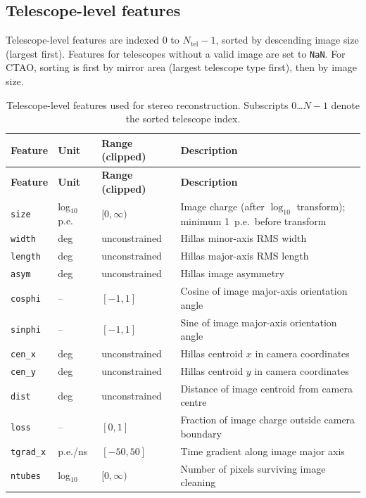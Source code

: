 \documentclass[12pt]{article}
\begin{document}
\subsection{Telescope-level features}

Telescope-level features are indexed 0 to $N_\mathrm{tel}-1$, sorted by descending
image size (largest first). Features for telescopes without a valid image are set to \texttt{NaN}.
For CTAO, sorting is first by mirror area (largest telescope type first), then by image size.

\begin{longtable}{lll p{5.5cm}}
\caption{Telescope-level features used for stereo reconstruction.
Subscripts 0\ldots$N-1$ denote the sorted telescope index.} \label{tab:features-image} \\
\hline
\textbf{Feature} & \textbf{Unit} & \textbf{Range (clipped)} & \textbf{Description} \\
\hline
\endfirsthead
\hline
\textbf{Feature} & \textbf{Unit} & \textbf{Range (clipped)} & \textbf{Description} \\
\hline
\endhead
\hline
\endfoot
\texttt{size} & log$_{10}$ p.e. & $[0,\infty)$ & Image charge (after $\log_{10}$ transform); minimum 1~p.e.\ before transform \\
\texttt{width} & deg & unconstrained & Hillas minor-axis RMS width \\
\texttt{length} & deg & unconstrained & Hillas major-axis RMS length \\
\texttt{asym} & deg & unconstrained & Hillas image asymmetry \\
\texttt{cosphi} & -- & $[-1,1]$ & Cosine of image major-axis orientation angle \\
\texttt{sinphi} & -- & $[-1,1]$ & Sine of image major-axis orientation angle \\
\texttt{cen\_x} & deg & unconstrained & Hillas centroid $x$ in camera coordinates \\
\texttt{cen\_y} & deg & unconstrained & Hillas centroid $y$ in camera coordinates \\
\texttt{dist} & deg & unconstrained & Distance of image centroid from camera centre \\
\texttt{loss} & -- & $[0,1]$ & Fraction of image charge outside camera boundary \\
\texttt{tgrad\_x} & p.e./ns & $[-50,50]$ & Time gradient along image major axis \\
\texttt{ntubes} & log$_{10}$ & $[0,\infty)$ & Number of pixels surviving image cleaning \\

\end{longtable}
\end{document}
